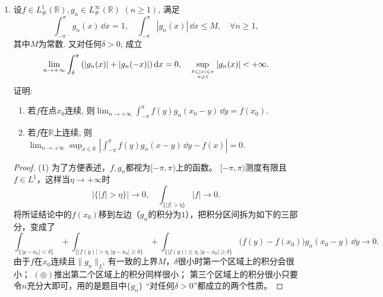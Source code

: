 \begin{quizb}
\begin{enumerate}
\item 设\(f\in L^1_{\#}(\mathbb{R}),g_n\in L^{\infty}_{\#}(\mathbb{R})\) \((n\geqslant 1)\), 满足
\[\int_{-\pi}^{\pi}g_n(x)\,\dd x=1,\quad\int_{-\pi}^{\pi}|g_n(x)|\,\dd x\leqslant M,\quad\forall n\geqslant 1,\]
其中\(M\)为常数. 又对任何\(\delta>0\), 成立
\[\lim_{n\rightarrow+\infty}\int_{\delta}^{\pi}\left(|g_n(x)|+|g_n(-x)|\right){\rm d} x=0,\quad \sup_{\delta\leqslant|x|\leqslant\pi \atop n\geqslant 1}|g_n(x)|<+\infty.\]
证明:
\begin{enumerate}[label=(\arabic*)]
\item 若\(f\)在点\(x_0\)连续, 则\(\lim_{n\rightarrow+\infty}\int_{-\pi}^{\pi}f(y)g_n(x_0-y)\,\dd y=f(x_0)\).
\item 若\(f\)在\(\mathbb{R}\)上连续, 则\(\lim_{n\rightarrow+\infty}\sup_{x\in\mathbb{R}}\left|\int_{-\pi}^{\pi}f(y)g_n(x-y)\,\dd y-f(x)\right|=0\).
\end{enumerate}
\begin{proof}
(1) 为了方便表述，$f,g_n$都视为$[-\pi,\pi)$上的函数。
$[-\pi,\pi)$测度有限且$f \in L^1$，这样当$\eta\to+\infty$时
\[|\{|f|>\eta\}|\to0,\quad\int_{\{|f|>\eta\}}|f|\to0.\tag{$\circledcirc$}\]
将所证结论中的$f(x_0)$移到左边（$g_n$的积分为$1$），把积分区间拆为如下的三部分，变成了
\[\int_{\{|y-x_0|<\delta\}}+\int_{\{|f(y)|>\eta,|y-x_0|\geqslant\delta\}}
+\int_{\{|f(y)|\leqslant\eta,|y-x_0|\geqslant\delta\}}
\big(f(y)-f(x_0)\big)g_n(x_0-y)\,\dd y\to0.\]
由于$f$在$x_0$连续且$\|g_n\|_{L^1}$有一致的上界$M$，$\delta$很小时第一个区域上的积分会很小；
$(\circledcirc)$推出第二个区域上的积分同样很小；
第三个区域上的积分很小只要令$n$充分大即可，用的是题目中$\{g_n\}$ ``对任何$\delta>0$''都成立的两个性质。


\end{proof}
\end{enumerate}
\end{quizb}
